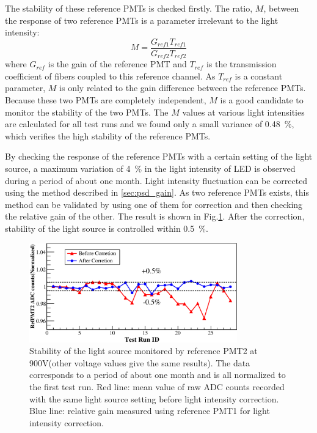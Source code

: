 \documentclass[preprint, times]{elsarticle}
\begin{document}
The stability of these reference PMTs is checked firstly. The ratio, $M$, between the response of two reference PMTs is a parameter irrelevant to the light intensity:
\begin{equation}
 M = \frac{G_{ref1} T_{ref1}}{G_{ref2} T_{ref2}}
\end{equation}
where $G_{ref}$ is the gain of the reference PMT and $T_{ref}$ is the transmission coefficient of fibers coupled to this reference channel.
As $T_{ref}$ is a constant parameter, $M$ is only related to the gain difference between the reference PMTs.
Because these two PMTs are completely independent, $M$ is a good candidate to monitor the stability of the two PMTs. 
The $M$ values at various light intensities are calculated for all test runs and we found only a small variance of \SI{0.48}{\percent}, which verifies the high stability of the reference PMTs.

By checking the response of the reference PMTs with a certain setting of the light source, a maximum variation of \SI{4}{\percent} in the light intensity of LED is observed during a period of about one month.
Light intensity fluctuation can be corrected using the method described in \ref{sec:psd_gain}.
As two reference PMTs exists, this method can be validated by using one of them for correction and then checking the relative gain of the other. 
The result is shown in Fig.\ref{fig:FIG13}.
After the correction, stability of the light source is controlled within \textpm\SI{0.5}{\percent}.

\begin{figure}
 \centering
 \includegraphics[width=90mm]{FIG13}
\caption{Stability of the light source monitored by reference PMT2 at 900V(other voltage values give the same results).
The data corresponds to a period of about one month and is all normalized to the first test run.
Red line: mean value of raw ADC counts recorded with the same light source setting before light intensity correction.
Blue line: relative gain measured using reference PMT1 for light intensity correction.}
\label{fig:FIG13}
\end{figure} 
\end{document}
